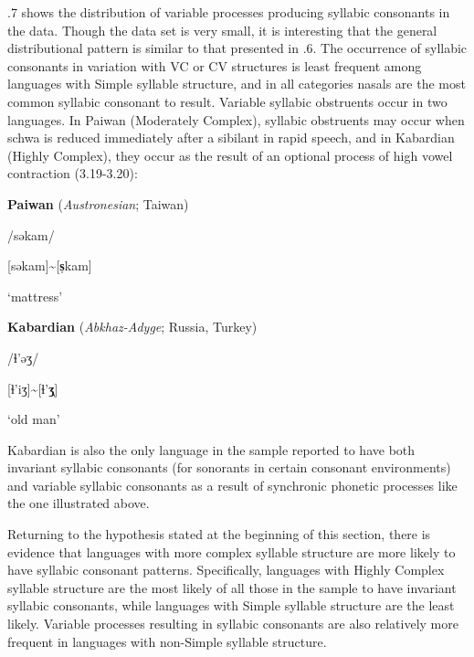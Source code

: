   .7 shows the distribution of variable processes producing syllabic consonants in the data. Though the data set is very small, it is interesting that the general distributional pattern is similar to that presented in .6. The occurrence of syllabic consonants in variation with VC or CV structures is least frequent among languages with Simple syllable structure, and in all categories nasals are the most common syllabic consonant to result. Variable syllabic obstruents occur in two languages. In Paiwan (Moderately Complex), syllabic obstruents may occur when schwa is reduced immediately after a sibilant in rapid speech, and in Kabardian (Highly Complex), they occur as the result of an optional process of high vowel contraction (3.19-3.20):



\ea\label{ex:(3.19)}
  \textbf{Paiwan} (\textit{Austronesian}; Taiwan)



/səkam/



[səkam]{\textasciitilde}[\textbf{s̩}kam]



‘mattress’



\citep[41]{Chang2006}

\z


\ea\label{ex:(3.20)}
  \textbf{Kabardian} (\textit{Abkhaz-Adyge}; Russia, Turkey)



/ɬ{}'əʒ/



[ɬ’iʒ]{\textasciitilde}[ɬ{}'\textbf{ʒ̩}]



‘old man’



\citep[24]{Kuipers1960}

\z


Kabardian is also the only language in the sample reported to have both invariant syllabic consonants (for sonorants in certain consonant environments) and variable syllabic consonants as a result of synchronic phonetic processes like the one illustrated above.



  Returning to the hypothesis stated at the beginning of this section, there is evidence that languages with more complex syllable structure are more likely to have syllabic consonant patterns. Specifically, languages with Highly Complex syllable structure are the most likely of all those in the sample to have invariant syllabic consonants, while languages with Simple syllable structure are the least likely. Variable processes resulting in syllabic consonants are also relatively more frequent in languages with non-Simple syllable structure.


